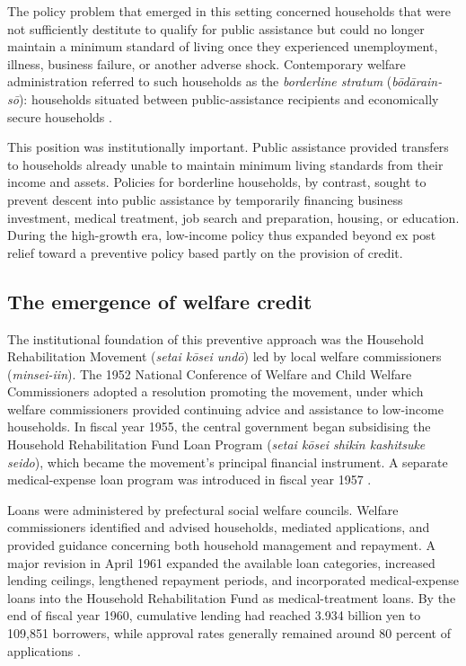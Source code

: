 \documentclass[12pt]{article}
\begin{document}
The policy problem that emerged in this setting concerned households that were not sufficiently destitute to qualify for public assistance but could no longer maintain a minimum standard of living once they experienced unemployment, illness, business failure, or another adverse shock. Contemporary welfare administration referred to such households as the \textit{borderline stratum} (\textit{b\={o}d\={a}rain-s\={o}}): households situated between public-assistance recipients and economically secure households \citep{MinistryOfHealth1958, Sakai2023}.

This position was institutionally important. Public assistance provided transfers to households already unable to maintain minimum living standards from their income and assets. Policies for borderline households, by contrast, sought to prevent descent into public assistance by temporarily financing business investment, medical treatment, job search and preparation, housing, or education. During the high-growth era, low-income policy thus expanded beyond ex post relief toward a preventive policy based partly on the provision of credit.

\subsection{The emergence of welfare credit}

The institutional foundation of this preventive approach was the Household Rehabilitation Movement (\textit{setai k\={o}sei und\={o}}) led by local welfare commissioners (\textit{minsei-iin}). The 1952 National Conference of Welfare and Child Welfare Commissioners adopted a resolution promoting the movement, under which welfare commissioners provided continuing advice and assistance to low-income households. In fiscal year 1955, the central government began subsidising the Household Rehabilitation Fund Loan Program (\textit{setai k\={o}sei shikin kashitsuke seido}), which became the movement's principal financial instrument. A separate medical-expense loan program was introduced in fiscal year 1957 \citep{MinistryOfHealth1958}.

Loans were administered by prefectural social welfare councils. Welfare commissioners identified and advised households, mediated applications, and provided guidance concerning both household management and repayment. A major revision in April 1961 expanded the available loan categories, increased lending ceilings, lengthened repayment periods, and incorporated medical-expense loans into the Household Rehabilitation Fund as medical-treatment loans. By the end of fiscal year 1960, cumulative lending had reached 3.934 billion yen to 109,851 borrowers, while approval rates generally remained around 80 percent of applications \citep{MinistryOfHealth1961}.
\end{document}
